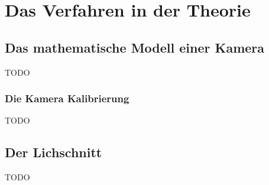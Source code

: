 \chapter{Das Verfahren in der Theorie}

\section{Das mathematische Modell einer Kamera}
TODO

\subsection{Die Kamera Kalibrierung}
TODO

\section{Der Lichschnitt}
TODO